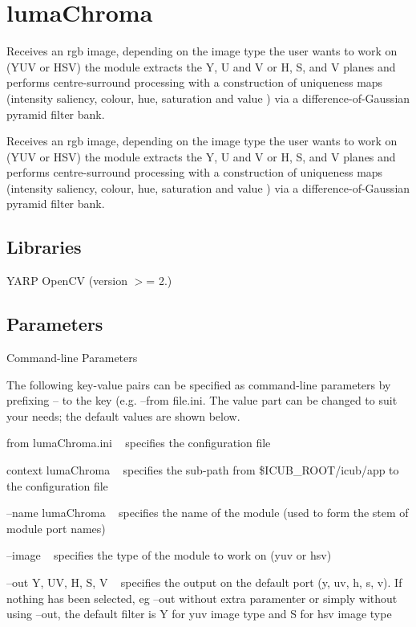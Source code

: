 \section{luma\+Chroma}
\label{group__lumaChroma}


Receives an rgb image, depending on the image type the user wants to work on (Y\+UV or H\+SV) the module extracts the Y, U and V or H, S, and V planes and performs centre-\/surround processing with a construction of uniqueness maps (intensity saliency, colour, hue, saturation and value ) via a difference-\/of-\/\+Gaussian pyramid filter bank.  


Receives an rgb image, depending on the image type the user wants to work on (Y\+UV or H\+SV) the module extracts the Y, U and V or H, S, and V planes and performs centre-\/surround processing with a construction of uniqueness maps (intensity saliency, colour, hue, saturation and value ) via a difference-\/of-\/\+Gaussian pyramid filter bank. 

\hypertarget{group__blobExtractor_lib_sec}{}\subsection{Libraries}\label{group__blobExtractor_lib_sec}
Y\+A\+RP Open\+CV (version $>$= 2.)\hypertarget{group__seg2cloud_parameters_sec}{}\subsection{Parameters}\label{group__seg2cloud_parameters_sec}
Command-\/line Parameters

The following key-\/value pairs can be specified as command-\/line parameters by prefixing {\ttfamily --} to the key (e.\+g. {\ttfamily --from} file.\+ini. The value part can be changed to suit your needs; the default values are shown below.


\begin{DoxyItemize}
\item {\ttfamily from} {\ttfamily luma\+Chroma.\+ini} ~\newline
 specifies the configuration file
\item {\ttfamily context} {\ttfamily luma\+Chroma} ~\newline
 specifies the sub-\/path from {\ttfamily \$\+I\+C\+U\+B\+\_\+\+R\+O\+OT/icub/app} to the configuration file
\item {\ttfamily --name} {\ttfamily luma\+Chroma} ~\newline
 specifies the name of the module (used to form the stem of module port names)
\item {\ttfamily --image}  ~\newline
 specifies the type of the module to work on (yuv or hsv)
\item {\ttfamily --out} {\ttfamily Y}, UV, H, S, V ~\newline
 specifies the output on the default port (y, uv, h, s, v). If nothing has been selected, eg --out without extra paramenter or simply without using --out, the default filter is Y for yuv image type and S for hsv image type
\end{DoxyItemize}

